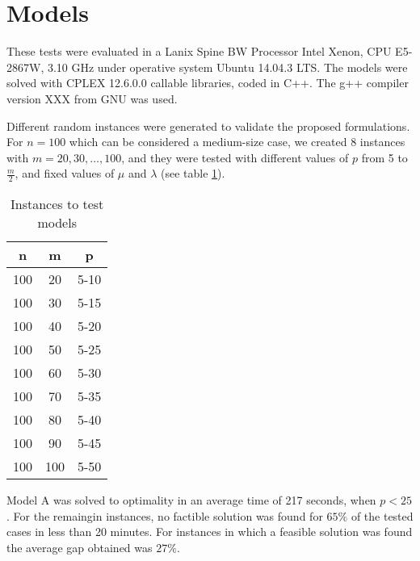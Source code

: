 \section{Models}
%

These tests were evaluated in
a Lanix Spine BW Processor Intel Xenon,
CPU E5-2867W, 3.10 GHz
under operative system Ubuntu 14.04.3 LTS.
The models were solved with 
CPLEX 12.6.0.0 callable libraries,
coded in C++.
The g++ compiler version XXX 
from GNU was used.

Different random instances were generated
to validate the proposed formulations.
For $n = 100$
which can be considered a medium-size case,
we created 8 instances with $m = 20,30,\ldots,100$,
and they were tested with different values of $p$ from 5 to $\frac{m}{2}$,
and fixed values of $\mu$ and $\lambda$
(see table \ref{tab:tests}).
\begin{table}
  \centering
  \begin{tabular}{|c|c|c|}\hline
    n & m & p \\ \hline
    100 & 20 & 5-10 \\
    100 & 30 & 5-15 \\
    100 & 40 & 5-20 \\
    100 & 50 & 5-25 \\
    100 & 60 & 5-30 \\
    100 & 70 & 5-35 \\
    100 & 80 & 5-40 \\
    100 & 90 & 5-45 \\
    100 & 100 & 5-50 \\
    \hline
  \end{tabular}
  \caption{Instances to test models}
  \label{tab:tests}
\end{table}

Model A was solved to optimality
in an average time of 217 seconds,
when $p < 25$.
For the remaingin instances,
no factible solution was found
for $65\%$ of the tested cases
in less than 20 minutes.
For instances in which a feasible solution was found
the average gap obtained was $27\%$.

